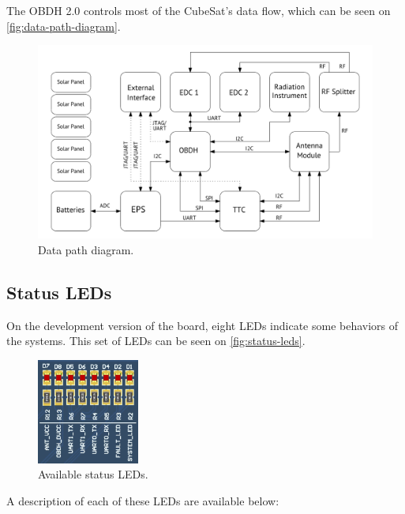 The OBDH 2.0 controls most of the CubeSat's data flow, which can be seen on \autoref{fig:data-path-diagram}.
\begin{figure}[!ht]
    \begin{center}
        \includegraphics[width=\textwidth]{figures/data_path_diagram.pdf}
        \caption{Data path diagram.}
        \label{fig:data-path-diagram}
    \end{center}
\end{figure}

\subsection{Status LEDs} \label{sec:status-leds}

On the development version of the board, eight LEDs indicate some behaviors of the systems. This set of LEDs can be seen on \autoref{fig:status-leds}.

\begin{figure}[!ht]
    \begin{center}
        \includegraphics[width=0.3\textwidth]{figures/status_leds.png}
        \caption{Available status LEDs.}
        \label{fig:status-leds}
    \end{center}
\end{figure}

A description of each of these LEDs are available below:

